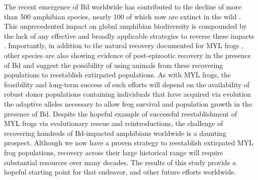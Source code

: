 \documentclass[9pt,twocolumn,twoside,lineno]{pnas-new}
\begin{document}
The recent emergence of Bd worldwide has contributed to the decline of
more than 500 amphibian species, nearly 100 of which now are extinct in
the wild \citep{scheele2019}. This unprecedented impact on global
amphibian biodiversity is compounded by the lack of any effective and
broadly applicable strategies to reverse these impacts
\citep{garner2016, knapp2022}. Importantly, in addition to the natural
recovery documented for MYL frogs \citep{knapp2016}, other species are
also showing evidence of post-epizootic recovery in the presence of Bd
\citep{scheele2017, voyles2018} and suggest the possibility of using
animals from these recovering populations to reestablish extirpated
populations. As with MYL frogs, the feasibility and long-term success of
such efforts will depend on the availability of robust donor populations
containing individuals that have acquired via evolution the adaptive
alleles necessary to allow frog survival and population growth in the
presence of Bd. Despite the hopeful example of successful
reestablishment of MYL frogs via evolutionary rescue and
reintroductions, the challenge of recovering hundreds of Bd-impacted
amphibians worldwide is a daunting prospect. Although we now have a
proven strategy to reestablish extirpated MYL frog populations, recovery
across their large historical range will require substantial resources
over many decades. The results of this study provide a hopeful starting
point for that endeavor, and other future efforts worldwide.
\end{document}
